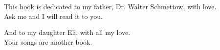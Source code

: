 \frontmatter

This book is dedicated to my father, 
Dr. Walter Schmettow, with love.\\
Ask me and I will read it to you.

And to my daughter Eli, with all my love.\\
Your songs are another book.

\mainmatter

